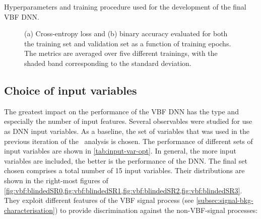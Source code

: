 \begin{table}[ht]
    \begin{center}
    
    \end{center}
    \caption{Hyperparameters and training procedure used for the development of the final VBF DNN.
    }
    \label{tab:DNN-info}
\end{table}

\begin{figure}[t]
    \caption{(a) Cross-entropy loss and (b) binary accuracy evaluated for both the training set and validation set as a function of training epochs. The metrics are averaged over five different trainings, with the shaded band corresponding to the standard deviation.}
    \label{fig:monitoring}
\end{figure}

\subsection{Choice of input variables}
The greatest impact on the performance of the VBF DNN has the type and especially the number of input features. 
Several observables were studied for use as DNN input variables. As a baseline, the set of variables that was used in the previous iteration of the \HWW\ analysis \cite{} is chosen.
The performance of different sets of input variables are shown in \cref{tab:input-var-opt}. In general, the more input variables are included, the better is the performance of the DNN. 
The final set chosen comprises a total number of 15 input variables. 
Their distributions are shown in the right-most figures of \cref{fig:vbf:blindedSR0,fig:vbf:blindedSR1,fig:vbf:blindedSR2,fig:vbf:blindedSR3}. They exploit different features of the VBF signal process (see \cref{subsec:signal-bkg-characterisation}) to provide discrimination against the non-VBF-signal processes:
